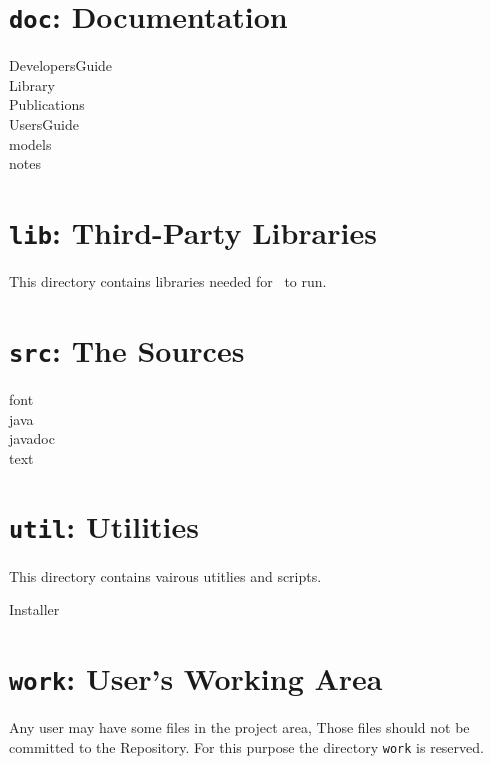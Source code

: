 \documentclass{extex-doc}
\begin{document}
\section{\texttt{doc}: Documentation}

\begin{description}
\item[DevelopersGuide] 
\item[Library] 
\item[Publications] 
\item[UsersGuide] 
\item[models] 
\item[notes] 
\end{description}

\section{\texttt{lib}: Third-Party Libraries}

This directory contains libraries needed for \ExTeX\ to run.

\section{\texttt{src}: The Sources}

\begin{description}
\item[font] 
\item[java] 
\item[javadoc] 
\item[text] 
\end{description}

\section{\texttt{util}: Utilities}

This directory contains vairous utitlies and scripts.

\begin{description}
\item[Installer] 
\end{description}

\section{\texttt{work}: User's Working Area}

Any user may have some files in the project area, Those files should
not be committed to the Repository. For this purpose the directory
\texttt{work} is reserved.
\end{document}
